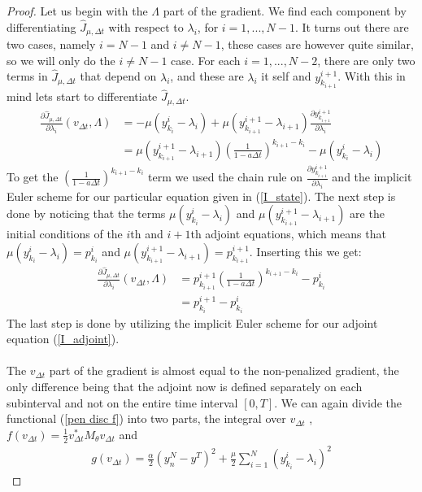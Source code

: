\begin{proof}
Let us begin with the $\Lambda$ part of the gradient. We find each component by differentiating $\hat J_{\mu,\Delta t} $ with respect to $\lambda_i$, for $i=1,...,N-1$. It turns out there are two cases, namely $i=N-1$ and $i\neq N-1$, these cases are however quite similar, so we will only do the $i\neq N-1$ case. For each $i=1,...,N-2$, there are only two terms in $\hat J_{\mu,\Delta t} $ that depend on $\lambda_i$, and these are $\lambda_i$ it self and $y_{k_{i+1}}^{i+1}$. With this in mind lets start to differentiate $\hat J_{\mu,\Delta t} $.
\begin{align*}
\frac{\partial\hat J_{\mu,\Delta t}}{\partial \lambda_i}(v_{\Delta t},\Lambda) &=-\mu (y_{k_i}^i-\lambda_i) +\mu(y_{k_{i+1}}^{i+1}-\lambda_{i+1})\frac{\partial y_{k_{i+1}}^{i+1}}{\partial \lambda_i}  \\
&=\mu(y_{k_{i+1}}^{i+1}-\lambda_{i+1})(\frac{1}{1-a\Delta t})^{k_{i+1}-k_i} -\mu (y_{k_i}^i-\lambda_i)
\end{align*}
To get the $(\frac{1}{1-a\Delta t})^{k_{i+1}-k_i}$ term we used the chain rule on $\frac{\partial y_{k_{i+1}}^{i+1}}{\partial \lambda_i}$ and the implicit Euler scheme for our particular equation given in (\ref{I_state}). The next step is done by noticing that the terms $\mu (y_{k_i}^i-\lambda_i)$ and $\mu(y_{k_{i+1}}^{i+1}-\lambda_{i+1})$ are the initial conditions of the $i$th and $i+1$th adjoint equations, which means that $\mu (y_{k_i}^i-\lambda_i)=p_{k_i}^{i}$ and $\mu(y_{k_{i+1}}^{i+1}-\lambda_{i+1})=p_{k_{i+1}}^{i+1}$. Inserting this we get:
\begin{align*}
\frac{\partial\hat J_{\mu,\Delta t}}{\partial \lambda_i}(v_{\Delta t},\Lambda) &=p_{k_{i+1}}^{i+1}(\frac{1}{1-a\Delta t})^{k_{i+1}-k_i} -p_{k_i}^{i} \\
&= p_{k_{i}}^{i+1}-p_{k_i}^{i}
\end{align*}
The last step is done by utilizing the implicit Euler scheme for our adjoint equation (\ref{I_adjoint}).
\\
\\
The $v_{\Delta t}$ part of the gradient is almost equal to the non-penalized gradient, the only difference being that the adjoint now is defined separately on each subinterval and not on the entire time interval $[0,T]$. We can again divide the functional (\ref{pen disc f}) into two parts, the integral over $v_{\Delta t}$ , $f(v_{\Delta t})=\frac{1}{2} v_{\Delta t}^*M_{\theta}v_{\Delta t}$ and 
\begin{align*}
g(v_{\Delta t}) = \frac{\alpha}{2}(y_n^N-y^T)^2+\frac{\mu }{2}\sum_{i=1}^{N} (y_{k_i}^{i}-\lambda_i)^2

\end{align*}
\end{proof}
